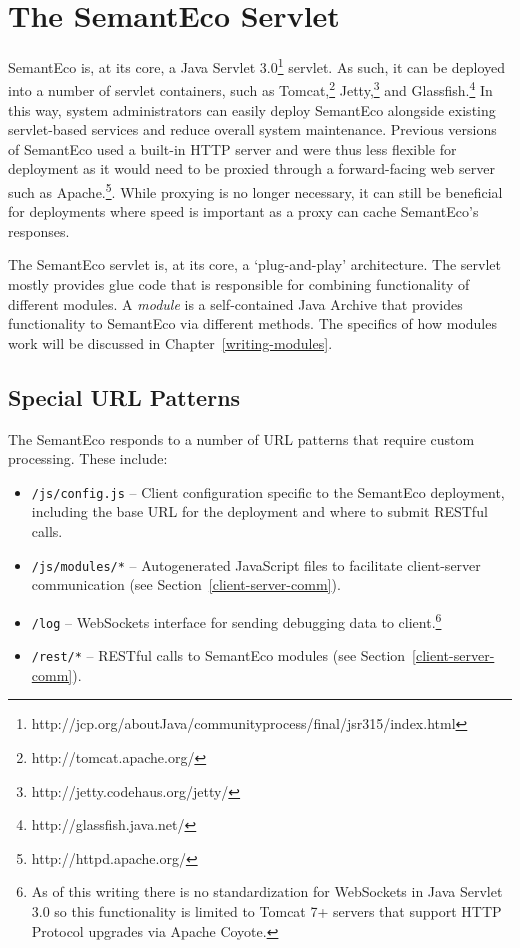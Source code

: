 \documentclass[letterpaper]{report}
\begin{document}
\section{The SemantEco Servlet}
\label{servlet}
SemantEco is, at its core, a Java Servlet 3.0\footnote{http://jcp.org/aboutJava/communityprocess/final/jsr315/index.html} servlet. As such, it can be deployed into a number of servlet containers, such as Tomcat,\footnote{http://tomcat.apache.org/} Jetty,\footnote{http://jetty.codehaus.org/jetty/} and Glassfish.\footnote{http://glassfish.java.net/} In this way, system administrators can easily deploy SemantEco alongside existing servlet-based services and reduce overall system maintenance. Previous versions of SemantEco used a built-in HTTP server and were thus less flexible for deployment as it would need to be proxied through a forward-facing web server such as Apache.\footnote{http://httpd.apache.org/}. While proxying is no longer necessary, it can still be beneficial for deployments where speed is important as a proxy can cache SemantEco's responses.

The SemantEco servlet is, at its core, a `plug-and-play' architecture. The servlet mostly provides glue code that is responsible for combining functionality of different modules. A \textit{module} is a self-contained Java Archive that provides functionality to SemantEco via different methods. The specifics of how modules work will be discussed in Chapter~\ref{writing-modules}.

\subsection{Special URL Patterns}
The SemantEco responds to a number of URL patterns that require custom processing. These include:
\begin{itemize}
\item \texttt{/js/config.js} -- Client configuration specific to the SemantEco deployment, including the base URL for the deployment and where to submit RESTful calls.
\item \texttt{/js/modules/*} -- Autogenerated JavaScript files to facilitate client-server communication (see Section~\ref{client-server-comm}).
\item \texttt{/log} -- WebSockets interface for sending debugging data to client.\footnote{As of this writing there is no standardization for WebSockets in Java Servlet 3.0 so this functionality is limited to Tomcat 7+ servers that support HTTP Protocol upgrades via Apache Coyote.}
\item \texttt{/rest/*} -- RESTful calls to SemantEco modules (see Section~\ref{client-server-comm}).
\end{itemize}
\end{document}
